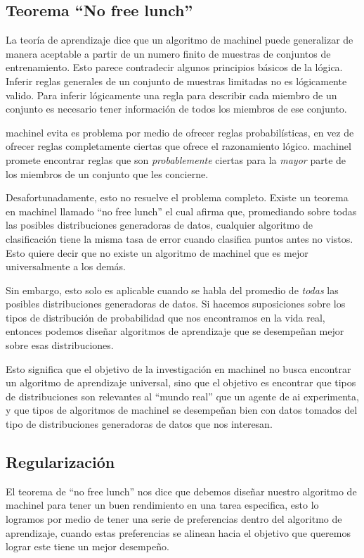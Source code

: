 \subsection{Teorema ``No free lunch''}
La teoría de aprendizaje dice que un algoritmo de \gls{machinel} puede generalizar de manera aceptable a partir de un numero finito de muestras de conjuntos de entrenamiento. Esto parece contradecir algunos principios básicos de la lógica. Inferir reglas generales de un conjunto de muestras limitadas no es lógicamente valido. Para inferir lógicamente una regla para describir cada miembro de un conjunto es necesario tener información de todos los miembros de ese conjunto.

\gls{machinel} evita es problema por medio de ofrecer reglas probabilísticas, en vez de ofrecer reglas completamente ciertas que ofrece el razonamiento lógico. \gls{machinel} promete encontrar reglas que son \textit{probablemente} ciertas para la \textit{mayor} parte de los miembros de un conjunto que les concierne.

Desafortunadamente, esto no resuelve el problema completo. Existe un teorema en \gls{machinel} llamado ``no free lunch'' el cual afirma que, promediando sobre todas las posibles distribuciones generadoras de datos, cualquier algoritmo de clasificación tiene la misma tasa de error cuando clasifica puntos antes no vistos. Esto quiere decir que no existe un algoritmo de \gls{machinel} que es mejor universalmente a los demás.

Sin embargo, esto solo es aplicable cuando se habla del promedio de \textit{todas} las posibles distribuciones generadoras de datos. Si hacemos suposiciones sobre los tipos de distribución de probabilidad que nos encontramos en la vida real, entonces podemos diseñar algoritmos de aprendizaje que se desempeñan mejor sobre esas distribuciones.

Esto significa que el objetivo de la investigación en \gls{machinel} no busca encontrar un algoritmo de aprendizaje universal, sino que el objetivo es encontrar que tipos de distribuciones son relevantes al ``mundo real'' que un agente de \gls{ai} experimenta, y que tipos de algoritmos de \gls{machinel} se desempeñan bien con datos tomados del tipo de distribuciones generadoras de datos que nos interesan.

\subsection{Regularización}
El teorema de ``no free lunch'' nos dice que debemos diseñar nuestro algoritmo de \gls{machinel} para tener un buen rendimiento en una tarea especifica, esto lo logramos por medio de tener una serie de preferencias dentro del algoritmo de aprendizaje, cuando estas preferencias se alinean hacia el objetivo que queremos lograr este tiene un mejor desempeño.

